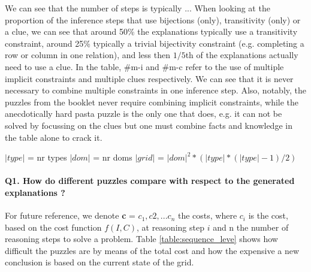 We can see that the number of steps is typically ... When looking at the proportion of the inference steps that use bijections (only), transitivity (only) or a clue, we can see that around 50\% the explanations typically use a transitivity constraint, around 25\% typically a trivial bijectivity constraint (e.g. completing a row or column in one relation), and less then $1/5$th of the explanations actually need to use a clue.
In the table, \#m-i and \#m-c refer to the use of multiple implicit constraints and multiple clues respectively. We can see that it is never necessary to combine multiple constraints in one inference step. Also, notably, the puzzles from the booklet never require combining implicit constraints, while the anecdotically hard pasta puzzle is the only one that does, e.g. it can not be solved by focussing on the clues but one must combine facts and knowledge in the table alone to crack it.

\begin{table}
	\centering
\caption{smth}
\label{table:smth}
\end{table}


$|type|$ = nr types
$|dom|$ = nr doms
$|grid|$ = $|dom|^2 * (|type|*(|type|-1)/2)$


\paragraph{Q1. How do different puzzles compare with respect to the generated explanations ?} For future reference, we denote \textbf{c} = $c_1, c2, ...c_n$ the costs, where $c_i$ is the cost, based on the cost function $f(I, C)$, at reasoning step $i$ and n the number of reasoning steps to solve a problem. Table \ref{table:sequence_leve} shows how difficult the puzzles are by means of the total cost and how the expensive a new conclusion is based on the current state of the grid.


